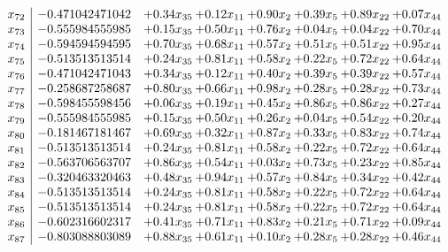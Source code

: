 \documentclass[8pt]{article}
\begin{document}
\[\begin{array}{c| c c@{\hskip 2pt} c@{\hskip 2pt} c@{\hskip 2pt} c@{\hskip 2pt} c@{\hskip 2pt} c@{\hskip 2pt} }
 x_{72}   &  -0.471042471042 & +  0.34 x_{35} & +  0.12 x_{11} & +  0.90 x_{2} & +  0.39 x_{5} & +  0.89 x_{22} & +  0.07 x_{44}\\
 x_{73}   &  -0.555984555985 & +  0.15 x_{35} & +  0.50 x_{11} & +  0.76 x_{2} & +  0.04 x_{5} & +  0.04 x_{22} & +  0.70 x_{44}\\
 x_{74}   &  -0.594594594595 & +  0.70 x_{35} & +  0.68 x_{11} & +  0.57 x_{2} & +  0.51 x_{5} & +  0.51 x_{22} & +  0.95 x_{44}\\
 x_{75}   &  -0.513513513514 & +  0.24 x_{35} & +  0.81 x_{11} & +  0.58 x_{2} & +  0.22 x_{5} & +  0.72 x_{22} & +  0.64 x_{44}\\
 x_{76}   &  -0.471042471043 & +  0.34 x_{35} & +  0.12 x_{11} & +  0.40 x_{2} & +  0.39 x_{5} & +  0.39 x_{22} & +  0.57 x_{44}\\
 x_{77}   &  -0.258687258687 & +  0.80 x_{35} & +  0.66 x_{11} & +  0.98 x_{2} & +  0.28 x_{5} & +  0.28 x_{22} & +  0.73 x_{44}\\
 x_{78}   &  -0.598455598456 & +  0.06 x_{35} & +  0.19 x_{11} & +  0.45 x_{2} & +  0.86 x_{5} & +  0.86 x_{22} & +  0.27 x_{44}\\
 x_{79}   &  -0.555984555985 & +  0.15 x_{35} & +  0.50 x_{11} & +  0.26 x_{2} & +  0.04 x_{5} & +  0.54 x_{22} & +  0.20 x_{44}\\
 x_{80}   &  -0.181467181467 & +  0.69 x_{35} & +  0.32 x_{11} & +  0.87 x_{2} & +  0.33 x_{5} & +  0.83 x_{22} & +  0.74 x_{44}\\
 x_{81}   &  -0.513513513514 & +  0.24 x_{35} & +  0.81 x_{11} & +  0.58 x_{2} & +  0.22 x_{5} & +  0.72 x_{22} & +  0.64 x_{44}\\
 x_{82}   &  -0.563706563707 & +  0.86 x_{35} & +  0.54 x_{11} & +  0.03 x_{2} & +  0.73 x_{5} & +  0.23 x_{22} & +  0.85 x_{44}\\
 x_{83}   &  -0.320463320463 & +  0.48 x_{35} & +  0.94 x_{11} & +  0.57 x_{2} & +  0.84 x_{5} & +  0.34 x_{22} & +  0.42 x_{44}\\
 x_{84}   &  -0.513513513514 & +  0.24 x_{35} & +  0.81 x_{11} & +  0.58 x_{2} & +  0.22 x_{5} & +  0.72 x_{22} & +  0.64 x_{44}\\
 x_{85}   &  -0.513513513514 & +  0.24 x_{35} & +  0.81 x_{11} & +  0.58 x_{2} & +  0.22 x_{5} & +  0.72 x_{22} & +  0.64 x_{44}\\
 x_{86}   &  -0.602316602317 & +  0.41 x_{35} & +  0.71 x_{11} & +  0.83 x_{2} & +  0.21 x_{5} & +  0.71 x_{22} & +  0.09 x_{44}\\
 x_{87}   &  -0.803088803089 & +  0.88 x_{35} & +  0.61 x_{11} & +  0.10 x_{2} & +  0.28 x_{5} & +  0.28 x_{22} & +  0.46 x_{44}\\

\end{array}\]
\end{document}
